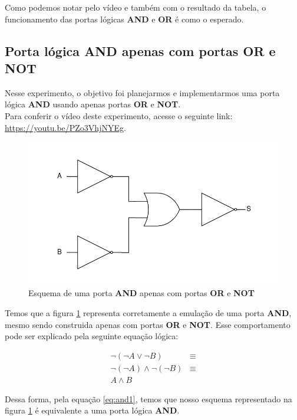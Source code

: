 \documentclass[12pt]{article}
\begin{document}
Como podemos notar pelo vídeo e também com o resultado da tabela, o
funcionamento das portas lógicas \textbf{AND} e \textbf{OR} é como o esperado.
\\[2em]

\subsection{Porta lógica \textbf{AND} apenas com portas \textbf{OR} e \textbf{NOT}}
\label{sec:and_with_only_or_and_not}

Nesse experimento, o objetivo foi planejarmos e implementarmos uma porta lógica
\textbf{AND} usando apenas portas \textbf{OR} e \textbf{NOT}.\\
Para conferir o vídeo deste experimento, acesse o seguinte link:
\href{https://youtu.be/PZo3VhjNYEg}{https://youtu.be/PZo3VhjNYEg}.

\begin{figure}[H]
    \centering
    \includegraphics[width=.9\textwidth]{exp1_2.3_f1.png}
    \caption{Esquema de uma porta \textbf{AND} apenas com portas \textbf{OR} e \textbf{NOT}}
    \label{fig:exp1_2.3_f1}
\end{figure}

Temos que a figura \ref{fig:exp1_2.3_f1} representa corretamente a emulação de
uma porta \textbf{AND}, mesmo sendo construida apenas com portas \textbf{OR} e
\textbf{NOT}. Esse comportamento pode ser explicado pela seguinte equação
lógica:

\begin{align}
\lnot (\lnot A \lor \lnot B) &\equiv \\
\lnot (\lnot A) \land \lnot (\lnot B) &\equiv \\
A \land B \label{eq:and1}
\end{align}

Dessa forma, pela equação \ref{eq:and1}, temos que nosso esquema representado na figura
\ref{fig:exp1_2.3_f1} é equivalente a uma porta lógica \textbf{AND}.
\end{document}
